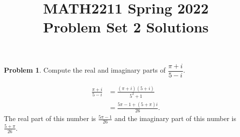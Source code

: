 \documentclass[11pt,oneside]{amsart}
\title{MATH2211 Spring 2022\\
Problem Set 2 Solutions}
\theoremstyle{definition}
\newtheorem{problem}{Problem}
\begin{document}
    \maketitle

    \begin{problem}
        Compute the real and imaginary parts of $\dfrac{\pi+i}{5-i}$.
    \end{problem}
    \begin{solution}
        \[\begin{split}
            \frac{\pi+i}{5-i} &= \frac{(\pi+i)(5+i)}{5^2+1}\\
            &= \frac{5\pi-1+(5+\pi)i}{26}.
        \end{split}\]
        The real part of this number is $\frac{5\pi-1}{26}$ and the imaginary part of this number is $\frac{5+\pi}{26}$.
    \end{solution}
\end{document}

